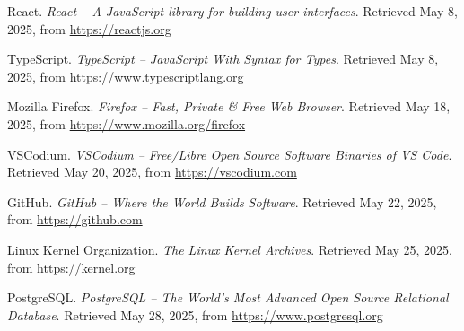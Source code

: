 \begin{thebibliography}{99}
    React. \textit{React – A JavaScript library for building user interfaces}. Retrieved May 8, 2025, from \url{https://reactjs.org}

    TypeScript. \textit{TypeScript – JavaScript With Syntax for Types}. Retrieved May 8, 2025, from \url{https://www.typescriptlang.org}
    
    Mozilla Firefox. \textit{Firefox – Fast, Private \& Free Web Browser}. Retrieved May 18, 2025, from \url{https://www.mozilla.org/firefox}
    
    VSCodium. \textit{VSCodium – Free/Libre Open Source Software Binaries of VS Code}. Retrieved May 20, 2025, from \url{https://vscodium.com}

    GitHub. \textit{GitHub – Where the World Builds Software}. Retrieved May 22, 2025, from \url{https://github.com}

    Linux Kernel Organization. \textit{The Linux Kernel Archives}. Retrieved May 25, 2025, from \url{https://kernel.org}

    PostgreSQL. \textit{PostgreSQL – The World's Most Advanced Open Source Relational Database}. Retrieved May 28, 2025, from \url{https://www.postgresql.org}
    
\end{thebibliography}